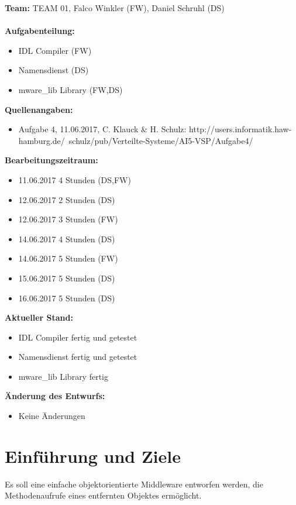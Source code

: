 \documentclass{article}
\begin{document}
\textbf{Team:} TEAM 01, Falco Winkler (FW), Daniel Schruhl (DS)\\
\\
\textbf{Aufgabenteilung:}
\begin{itemize}
    \item IDL Compiler (FW)
    \item Namensdienst (DS)
    \item mware\_lib Library (FW,DS)
\end{itemize}

\textbf{Quellenangaben:}
\begin{itemize}
    \item Aufgabe 4, 11.06.2017, C. Klauck \& H. Schulz: \newline
    http://users.informatik.haw-hamburg.de/~schulz/pub/Verteilte-Systeme/AI5-VSP/Aufgabe4/
\end{itemize}

\textbf{Bearbeitungszeitraum:}
\begin{itemize}
	\item 11.06.2017 4 Stunden (DS,FW)
	\item 12.06.2017 2 Stunden (DS)
	\item 12.06.2017 3 Stunden (FW)
	\item 14.06.2017 4 Stunden (DS)
	\item 14.06.2017 5 Stunden (FW)
	\item 15.06.2017 5 Stunden (DS)
	\item 16.06.2017 5 Stunden (DS)
\end{itemize}

\textbf{Aktueller Stand:}
\begin{itemize}
	\item IDL Compiler fertig und getestet
    \item Namensdienst fertig und getestet
    \item mware\_lib Library fertig
\end{itemize}

\textbf{Änderung des Entwurfs:}
\begin{itemize}
    \item Keine Änderungen
\end{itemize}

\newpage

\section{Einführung und Ziele}
Es soll eine einfache objektorientierte Middleware entworfen werden, die Methodenaufrufe
eines entfernten Objektes ermöglicht.\\
\end{document}
